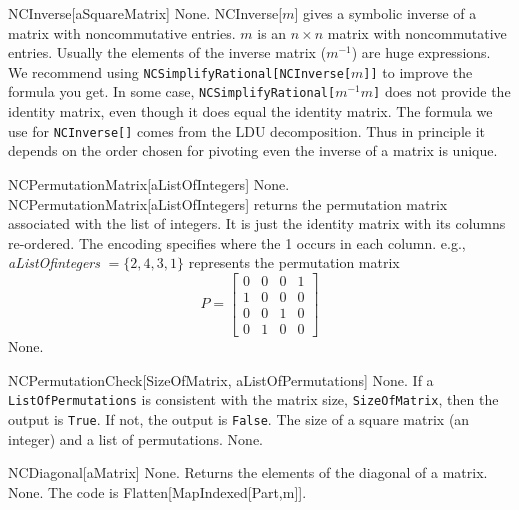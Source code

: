 \CommandEntry
{NCInverse[aSquareMatrix]}
{None.}
{NCInverse[$m$] gives a symbolic inverse of a matrix with noncommutative 
entries.}
{$m$ is an $n\times n$ matrix with noncommutative entries.}
{Usually the elements of the inverse matrix ($m^{-1}$) are huge expressions.
We recommend using  {\tt NCSimplifyRational[NCInver\-se[$m$]]} to improve the 
formula you get. 
In some case, {\tt NCSimplifyRatio\-nal[$m^{-1}  m$]} does not 
provide the identity matrix, even though it does equal the identity matrix.
The formula we use for {\tt NCInverse[]} comes from the LDU decomposition. 
Thus in principle it depends on the order chosen for pivoting even the 
inverse of a matrix is unique.  }

\CommandEntry
{NCPermutationMatrix[aListOfIntegers]}
{None.}
{NCPermutationMatrix[aListOfIntegers] returns the permutation matrix 
associated with the list of integers. It is just the identity matrix with 
its columns re-ordered.}
{The encoding specifies where the 1 occurs in each column. e.g.,
\textit{aListOfintegers} $=\{2,4,3,1\}$ represents the permutation matrix
\[ P = \left[ \begin{array}{cccc} 0 & 0 & 0 & 1 \\
1 & 0 & 0 & 0\\ 0& 0 & 1 & 0 \\ 0 & 1 & 0 & 0
\end{array} \right] \] }
{None.}

\CommandEntry
{NCPermutationCheck[SizeOfMatrix, aListOfPermutations]}
{None.}
{If a {\tt ListOfPermutations} is consistent with the matrix size, 
{\tt SizeOfMatrix}, then the output is {\tt True}. If not, the output is 
{\tt False}.}
{The size of a square matrix (an integer) and a list of permutations.}
{None.}

\CommandEntry
{NCDiagonal[aMatrix]}
{None.}
{Returns the elements of the diagonal of a matrix.}
{None.}
{The code is Flatten[MapIndexed[Part,m]].}

